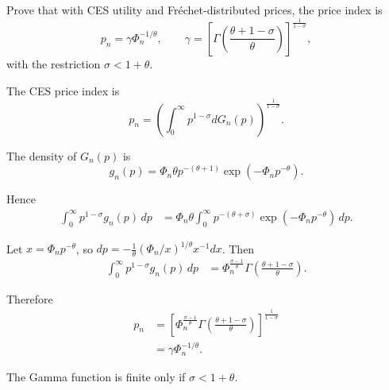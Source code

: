 
\begin{question}
Prove that with CES utility and Fréchet-distributed prices, the price index is
\[
p_n = \gamma \Phi_n^{-1/\theta}, \qquad 
\gamma = \left[\Gamma\!\left(\frac{\theta+1-\sigma}{\theta}\right)\right]^{\frac{1}{1-\sigma}},
\]
with the restriction $\sigma < 1+\theta$.
\end{question}

\begin{solution}
The CES price index is
\[
p_n = \left( \int_0^\infty p^{1-\sigma} dG_n(p) \right)^{\tfrac{1}{1-\sigma}}.
\]

The density of $G_n(p)$ is
\[
g_n(p) = \Phi_n \theta p^{-(\theta+1)} \exp(-\Phi_n p^{-\theta}).
\]

Hence
\begin{align*}
\int_0^\infty p^{1-\sigma} g_n(p)\, dp
&= \Phi_n \theta \int_0^\infty p^{-(\theta+\sigma)} 
    \exp(-\Phi_n p^{-\theta})\, dp.
\end{align*}

Let $x = \Phi_n p^{-\theta}$, so $dp = -\tfrac{1}{\theta} (\Phi_n/x)^{1/\theta} x^{-1} dx$. Then
\begin{align*}
\int_0^\infty p^{1-\sigma} g_n(p)\, dp
&= \Phi_n^{\tfrac{\sigma-1}{\theta}} 
   \Gamma\!\left(\tfrac{\theta+1-\sigma}{\theta}\right).
\end{align*}

Therefore
\begin{align*}
p_n &= \left[\Phi_n^{\tfrac{\sigma-1}{\theta}} 
   \Gamma\!\left(\tfrac{\theta+1-\sigma}{\theta}\right)\right]^{\tfrac{1}{1-\sigma}} \\
&= \gamma \Phi_n^{-1/\theta}.
\end{align*}

The Gamma function is finite only if $\sigma < 1 + \theta$.
\end{solution}
